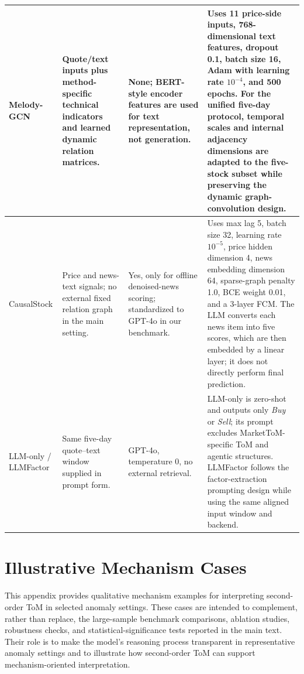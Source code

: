 \documentclass[a4paper,fleqn,doubleblind]{cas-sc}
\begin{document}
\begin{table}[b]
\begin{tabularx}{\textwidth}{>{\raggedright\arraybackslash}p{2.0cm}>{\raggedright\arraybackslash}p{2.55cm}>{\raggedright\arraybackslash}p{2.55cm}>{\raggedright\arraybackslash}X}
\midrule
Melody-GCN & Quote/text inputs plus method-specific technical indicators and learned dynamic relation matrices. & None; BERT-style encoder features are used for text representation, not generation. & Uses 11 price-side inputs, 768-dimensional text features, dropout 0.1, batch size 16, Adam with learning rate $10^{-4}$, and 500 epochs. For the unified five-day protocol, temporal scales and internal adjacency dimensions are adapted to the five-stock subset while preserving the dynamic graph-convolution design. \\
\midrule
CausalStock & Price and news-text signals; no external fixed relation graph in the main setting. & Yes, only for offline denoised-news scoring; standardized to GPT-4o in our benchmark. & Uses max lag 5, batch size 32, learning rate $10^{-5}$, price hidden dimension 4, news embedding dimension 64, sparse-graph penalty 1.0, BCE weight 0.01, and a 3-layer FCM. The LLM converts each news item into five scores, which are then embedded by a linear layer; it does not directly perform final prediction. \\
\midrule
LLM-only / LLMFactor & Same five-day quote--text window supplied in prompt form. & GPT-4o, temperature $0$, no external retrieval. & LLM-only is zero-shot and outputs only \textit{Buy} or \textit{Sell}; its prompt excludes MarketToM-specific ToM and agentic structures. LLMFactor follows the factor-extraction prompting design while using the same aligned input window and backend. \\
\bottomrule
\end{tabularx}
\label{tab:app_benchmark_settings}
\end{table}


\section{Illustrative Mechanism Cases}
\label{app:illustrative_cases}
This appendix provides qualitative mechanism examples for interpreting second-order ToM in selected anomaly settings. These cases are intended to complement, rather than replace, the large-sample benchmark comparisons, ablation studies, robustness checks, and statistical-significance tests reported in the main text. Their role is to make the model's reasoning process transparent in representative anomaly settings and to illustrate how second-order ToM can support mechanism-oriented interpretation.
\end{document}
